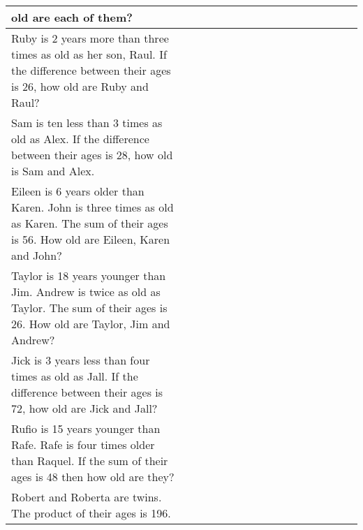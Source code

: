 \begin{longtable}{p{0.5\linewidth}>{\centering\arraybackslash$}p{0.5\linewidth}<{$}}
old are each of them? & \\ \hline
Ruby is 2 years more than three times as old as her son, Raul. If the difference between their ages is 26, how old are Ruby and Raul? & \\ \hline
Sam is ten less than 3 times as old as Alex. If the difference between their ages is 28, how old is Sam and Alex. & \\ \hline
Eileen is 6 years older than Karen. John is three times as old as Karen. The sum of their ages is 56. How old are Eileen, Karen and John? & \\ \hline
Taylor is 18 years younger than Jim. Andrew is twice as old as Taylor. The sum of their ages is 26. How old are Taylor, Jim and Andrew? & \\ \hline
Jick is 3 years less than four times as old as Jall. If the difference between their ages is 72, how old are Jick and Jall? & \\ \hline
Rufio is 15 years younger than Rafe. Rafe is four times older than Raquel. If the sum of their ages is 48 then how old are they? & \\ \hline
Robert and Roberta are twins. The product of their ages is 196. & \\ \hline
\hline
\end{longtable}
